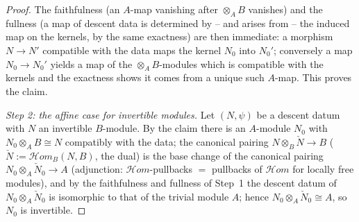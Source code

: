 \begin{proof}
The faithfulness (an $A$-map vanishing after
$\otimes_AB$ vanishes) and the fullness (a map of descent data is determined by --
and arises from -- the induced map on the kernels, by the same
exactness) are then immediate: a morphism $N\to N'$ compatible with
the data maps the kernel $N_0$ into $N_0'$; conversely a map
$N_0\to N_0'$ yields a map of the $\otimes_AB$-modules which is
compatible with the kernels and the exactness shows it comes from a
unique such $A$-map.  This proves the claim.

\emph{Step 2: the affine case for invertible modules.}  Let $(N,\psi)$
be a descent datum with $N$ an invertible $B$-module.  By the claim
there is an $A$-module $N_0$ with $N_0\otimes_AB\cong N$ compatibly
with the data; the canonical pairing
$N\otimes_B\check N\to B$ ($\check N:=\mathcal{H}om_B(N,B)$, the dual)
is the base change of the canonical pairing
$N_0\otimes_A\check N_0\to A$ (adjunction: $\mathcal{H}om$-pullbacks
$=$ pullbacks of $\mathcal{H}om$ for locally free modules), and by the
faithfulness and fullness of Step~1 the descent datum of
$N_0\otimes_A\check N_0$ is isomorphic to that of the trivial module
$A$; hence $N_0\otimes_A\check N_0\cong A$, so $N_0$ is invertible.


\end{proof}
